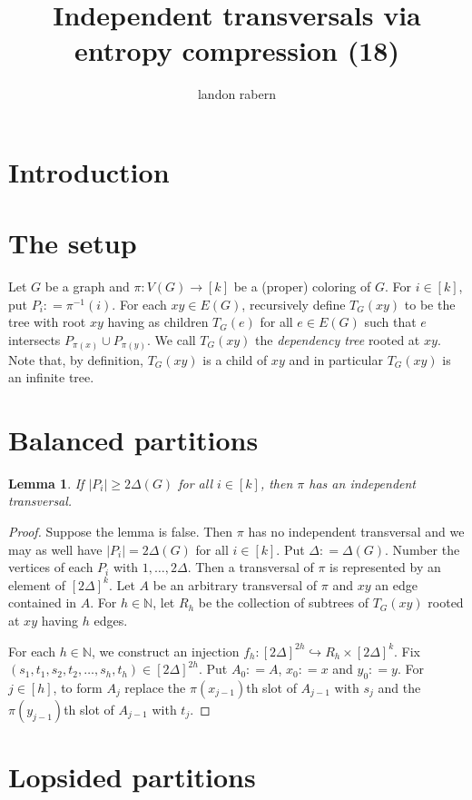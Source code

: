 \documentclass[12pt]{article}
\title{Independent transversals via entropy compression (18)}
\author{landon rabern}
\theoremstyle{plain}
\newtheorem{lem}[thm]{Lemma}
\theoremstyle{definition}
\theoremstyle{remark}
\newcommand{\IN}{\mathbb{N}}
\newcommand{\inj}{\hookrightarrow}
\newcommand{\card}[1]{\left|#1\right|}
\newcommand{\func}[3]{#1\colon #2 \rightarrow #3}
\newcommand{\funcinj}[3]{#1\colon #2 \inj #3}
\newcommand{\irange}[1]{\left[#1\right]}
\newcommand{\parens}[1]{\left( #1 \right)}
\newcommand{\DefinedAs}{\mathrel{\mathop:}=}
\begin{document}
\maketitle
\section{Introduction}
\section{The setup}
Let $G$ be a graph and $\func{\pi}{V(G)}{\irange{k}}$ be a (proper) coloring of $G$.  For $i \in \irange{k}$, put $P_i \DefinedAs \pi^{-1}(i)$.  For each $xy \in E(G)$, recursively define $T_G(xy)$ to be the tree with root $xy$ having as children $T_G(e)$ for all $e \in E(G)$ such that $e$ intersects $P_{\pi(x)} \cup P_{\pi(y)}$.  We call $T_G(xy)$ the \emph{dependency tree} rooted at $xy$.  Note that, by definition, $T_G(xy)$ is a child of $xy$ and in particular $T_G(xy)$ is an infinite tree.

\section{Balanced partitions}
\begin{lem}
If $\card{P_i} \geq 2\Delta(G)$ for all $i \in \irange{k}$, then $\pi$ has an independent transversal.
\end{lem}
\begin{proof}
Suppose the lemma is false. Then $\pi$ has no independent transversal and we may as well have $\card{P_i} = 2\Delta(G)$ for all $i \in \irange{k}$.  Put $\Delta \DefinedAs \Delta(G)$.  Number the vertices of each $P_i$ with $1, \ldots, 2\Delta$. Then a transversal of $\pi$ is represented by an element of $\irange{2\Delta}^k$.  Let $A$ be an arbitrary transversal of $\pi$ and $xy$ an edge contained in $A$.  For $h \in \IN$, let $R_h$ be the collection of subtrees of $T_G(xy)$ rooted at $xy$ having $h$ edges. 

For each $h \in \IN$, we construct an injection $\funcinj{f_h}{\irange{2\Delta}^{2h}}{R_h \times \irange{2\Delta}^k}$.  Fix $\parens{s_1, t_1, s_2, t_2, \ldots, s_h, t_h} \in \irange{2\Delta}^{2h}$.  Put $A_0 \DefinedAs A$, $x_0 \DefinedAs x$ and $y_0 \DefinedAs y$.  For $j \in \irange{h}$, to form $A_j$ replace the $\pi(x_{j-1})$th slot of $A_{j-1}$ with $s_j$ and the $\pi(y_{j-1})$th slot of $A_{j-1}$ with $t_j$.  
\end{proof}

\section{Lopsided partitions}
\end{document}
